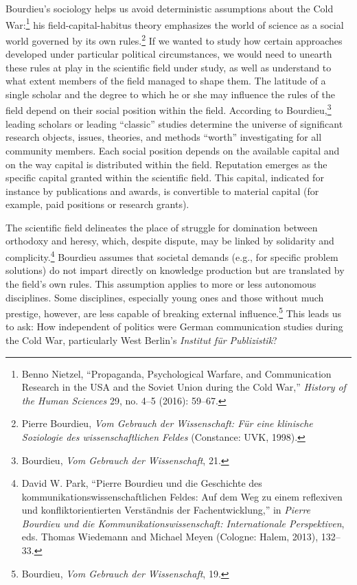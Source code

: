 \documentclass{tufte-handout}
\begin{document}
Bourdieu's sociology helps us avoid deterministic assumptions about the
Cold War:\footnote{Benno Nietzel, ``Propaganda, Psychological Warfare,
  and Communication Research in the USA and the Soviet Union during the
  Cold War,'' \emph{History of the Human Sciences} 29, no. 4--5 (2016):
  59--67.} his field-capital-habitus theory emphasizes the world of
science as a social world governed by its own rules.\footnote{Pierre
  Bourdieu, \emph{Vom Gebrauch der Wissenschaft: Für eine klinische
  Soziologie des wissenschaftlichen Feldes} (Constance: UVK, 1998).} If
we wanted to study how certain approaches developed under particular
political circumstances, we would need to unearth these rules at play in
the scientific field under study, as well as understand to what extent
members of the field managed to shape them. The latitude of a single
scholar and the degree to which he or she may influence the rules of the
field depend on their social position within the field. According to
Bourdieu,\footnote{Bourdieu, \emph{Vom Gebrauch der Wissenschaft}, 21.}
leading scholars or leading ``classic'' studies determine the universe
of significant research objects, issues, theories, and methods ``worth''
investigating for all community members. Each social position depends on
the available capital and on the way capital is distributed within the
field. Reputation emerges as the specific capital granted within the
scientific field. This capital, indicated for instance by publications
and awards, is convertible to material capital (for example, paid
positions or research grants).

The scientific field delineates the place of struggle for domination
between orthodoxy and heresy, which, despite dispute, may be linked by
solidarity and complicity.\footnote{David W. Park, ``Pierre Bourdieu und
  die Geschichte des kommunikationswissenschaftlichen Feldes: Auf dem
  Weg zu einem reflexiven und konfliktorientierten Verständnis der
  Fachentwicklung,'' in \emph{Pierre Bourdieu und die
  Kommunikationswissenschaft: Internationale Perspektiven}, eds. Thomas
  Wiedemann and Michael Meyen (Cologne: Halem, 2013), 132--33.} Bourdieu
assumes that societal demands (e.g., for specific problem solutions) do
not impart directly on knowledge production but are translated by the
field's own rules. This assumption applies to more or less autonomous
disciplines. Some disciplines, especially young ones and those without
much prestige, however, are less capable of breaking external
influence.\footnote{Bourdieu, \emph{Vom Gebrauch der Wissenschaft}, 19.}
This leads us to ask: How independent of politics were German
communication studies during the Cold War, particularly West Berlin's
\emph{Institut für Publizistik}?
\end{document}
